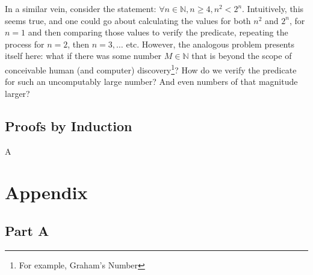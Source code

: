 \documentclass[10pt,a4paper,fleqn]{book}
\begin{document}
	 In a similar vein, consider the statement: $\forall n \in \mathbb{N}, n \geq 4, n^2 < 2^n$. Intuitively, this seems true, and one could go about calculating the values for both $n^2$ and $2^n$, for $n = 1$ and then comparing those values to verify the predicate, repeating the process for $n=2$, then $n=3, \ldots$  etc. However, the analogous problem presents itself here: what if there was some number $M \in \mathbb{N}$ that is beyond the scope of conceivable human (and computer) discovery\footnote{For example, Graham's Number}? How do we verify the predicate for such an uncomputably large number? And even numbers of that magnitude larger?

	\section{Proofs by Induction}
		A

	\chapter{Appendix}
		\section{Part A}
\end{document}
